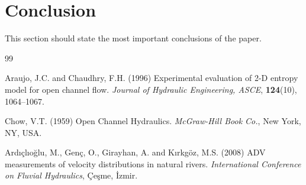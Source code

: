 \documentclass[a4paper,12pt]{article}
\begin{document}
\section{Conclusion}
This section should state the most important conclusions of the paper.

\begin{thebibliography}{99}
\setlength{\itemsep}{2pt}

Araujo, J.C. and Chaudhry, F.H. (1996) Experimental evaluation of 2-D entropy
model for open channel flow. \textit{Journal of Hydraulic Engineering, ASCE},
\textbf{124}(10), 1064--1067.

Chow, V.T. (1959) Open Channel Hydraulics. \textit{McGraw-Hill Book Co.}, New
York, NY, USA.

Ard{\i}\c{c}l{\i}o\u{g}lu, M., Gen\c{c}, O., Girayhan, A. and K{\i}rkg\"{o}z,
M.S. (2008) ADV measurements of velocity distributions in natural rivers.
\textit{International Conference on Fluvial Hydraulics}, \c{C}e\c{s}me, {\.I}zmir.

\end{thebibliography}
\end{document}
